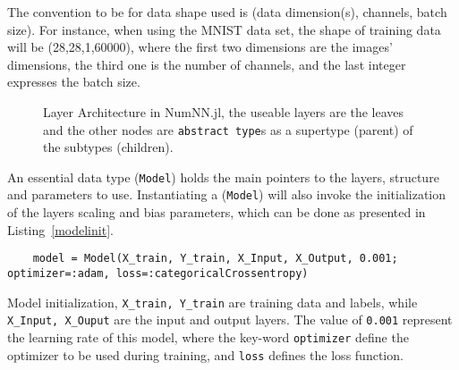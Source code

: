 The convention to be for data shape used is (data dimension(s), channels, batch size). For instance, when using the MNIST \cite{LeCun1998,LeCun1998a} data set, the shape of training data will be (28,28,1,60000), where the first two dimensions are the images' dimensions, the third one is the number of channels, and the last integer expresses the batch size.

\begin{figure}[!ht]
	\centering
		
	\caption{Layer Architecture in NumNN.jl, the useable layers are the leaves and the other nodes are \texttt{abstract type}s as a supertype (parent) of the subtypes (children).}\label{fig:layerstruct}
\end{figure}

An essential data type (\texttt{Model}) holds the main pointers to the layers, structure and parameters to use. Instantiating a (\texttt{Model}) will also invoke the initialization of the layers scaling and bias parameters, which can be done as presented in Listing~\ref{modelinit}.

\begin{listing}[H]
	\begin{verbatim}
	model = Model(X_train, Y_train, X_Input, X_Output, 0.001; optimizer=:adam, loss=:categoricalCrossentropy)
	\end{verbatim}
	\caption{Model initialization, \texttt{X_train, Y_train} are training data and labels, while \texttt{X_Input, X_Ouput} are the input and output layers. The value of \texttt{0.001} represent the learning rate of this model, where the key-word \texttt{optimizer} define the optimizer to be used during training, and \texttt{loss} defines the loss function.}\label{modelinit}
\end{listing}

